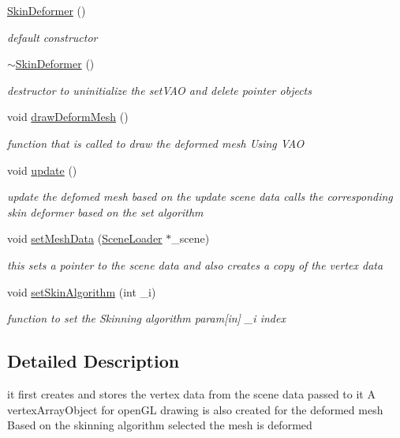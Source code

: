 \begin{DoxyCompactItemize}
\item 
\hyperlink{class_skin_deformer_a6cdb6cec406f97df387484aa74fb2e98}{Skin\-Deformer} ()
\begin{DoxyCompactList}\small\item\em default constructor \end{DoxyCompactList}\item 
\hyperlink{class_skin_deformer_a7afd6e1689fa0b7b998cda8317f531a6}{$\sim$\-Skin\-Deformer} ()
\begin{DoxyCompactList}\small\item\em destructor to uninitialize the set\-V\-A\-O and delete pointer objects \end{DoxyCompactList}\item 
void \hyperlink{class_skin_deformer_aa332485f42e502b40852cf1b947d89c0}{draw\-Deform\-Mesh} ()
\begin{DoxyCompactList}\small\item\em function that is called to draw the deformed mesh Using V\-A\-O \end{DoxyCompactList}\item 
void \hyperlink{class_skin_deformer_a1085c2782d53f0eb36295a5c676bc8c7}{update} ()
\begin{DoxyCompactList}\small\item\em update the defomed mesh based on the update scene data calls the corresponding skin deformer based on the set algorithm \end{DoxyCompactList}\item 
void \hyperlink{class_skin_deformer_a6d12659544bc1b8117d4cb49d3e21b91}{set\-Mesh\-Data} (\hyperlink{class_scene_loader}{Scene\-Loader} $\ast$\-\_\-scene)
\begin{DoxyCompactList}\small\item\em this sets a pointer to the scene data and also creates a copy of the vertex data \end{DoxyCompactList}\item 
void \hyperlink{class_skin_deformer_a2d87e720e3e80e806d6c63ffae71b1aa}{set\-Skin\-Algorithm} (int \-\_\-i)
\begin{DoxyCompactList}\small\item\em function to set the Skinning algorithm param\mbox{[}in\mbox{]} \-\_\-i index \end{DoxyCompactList}\end{DoxyCompactItemize}


\subsection{Detailed Description}
it first creates and stores the vertex data from the scene data passed to it A vertex\-Array\-Object for open\-G\-L drawing is also created for the deformed mesh Based on the skinning algorithm selected the mesh is deformed 

